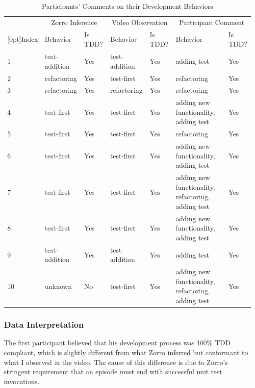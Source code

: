 \begin{table}
\centering
  \begin{tabular}{|l|p{2cm}|l|p{2cm}|l|p{7.5cm}|l|}
  \hline
      & \multicolumn{2}{c|}{Zorro Inference} & \multicolumn{2}{c|}{Video Observation} & 
        \multicolumn{2}{c|}{Participant Comment} \\ \cline{2-7}
   \raisebox{1.5ex}[0pt]{Index} &
    Behavior      & Is TDD? & Behavior  & Is TDD? & Behavior & Is TDD? \\ \hline
1 & test-addition & Yes & test-addition & Yes & adding test  & Yes \\ \hline
2 & refactoring   & Yes & test-first    & Yes & refactoring & Yes  \\ \hline
3 & refactoring   & Yes & refactoring   & Yes & refactoring & Yes  \\ \hline
4 & test-first    & Yes & test-first    & Yes & adding new functionality, adding test & Yes	\\ \hline
5 & test-first    & Yes & test-first    & Yes & refactoring & Yes  \\ \hline
6 & test-first    & Yes & test-first    & Yes & adding new functionality, adding test & Yes \\ \hline
7 & test-first    & Yes & test-first    & Yes & adding new functionality, refactoring, adding test & Yes \\ \hline
8 & test-first    & Yes & test-first    & Yes & adding new functionality, adding test & Yes	\\ \hline
9 & test-addition & Yes & test-addition & Yes & adding test & Yes  \\ \hline
10 & unknown      & No  & test-first    & Yes & adding new functionality, refactoring, adding test & Yes \\ \hline 
  \end{tabular}
  \caption{Participants' Comments on their Development Behaviors}
  \label{tab:ParticipantTDDBehavior}  
\end{table}

\subsubsection{Data Interpretation}

The first participant believed that his development process was 100\%
TDD compliant, which is slightly different from what Zorro inferred
but conformant to what I observed in the video. The cause of this
difference is due to Zorro's stringent requirement that an episode
must end with successful unit test invocations. 

